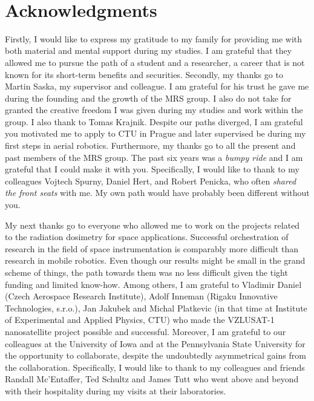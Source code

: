 
~\vfill{}

\section*{Acknowledgments}

Firstly, I would like to express my gratitude to my family for providing me with both material and mental support during my studies.
I am grateful that they allowed me to pursue the path of a student and a researcher, a career that is not known for its short-term benefits and securities.
Secondly, my thanks go to Martin Saska, my supervisor and colleague.
I am grateful for his trust he gave me during the founding and the growth of the MRS group.
I also do not take for granted the creative freedom I was given during my studies and work within the group.
I also thank to Tomas Krajnik.
Despite our paths diverged, I am grateful you motivated me to apply to CTU in Prague and later supervised be during my first steps in aerial robotics.
Furthermore, my thanks go to all the present and past members of the MRS group.
The past six years was a \emph{bumpy ride} and I am grateful that I could make it with you.
Specifically, I would like to thank to my colleagues Vojtech Spurny, Daniel Hert, and Robert Penicka, who often \emph{shared the front seats} with me.
My own path would have probably been different without you.

My next thanks go to everyone who allowed me to work on the projects related to the radiation dosimetry for space applications.
Successful orchestration of research in the field of space instrumentation is comparably more difficult than research in mobile robotics.
Even though our results might be small in the grand scheme of things, the path towards them was no less difficult given the tight funding and limited know-how.
Among others, I am grateful to Vladimir Daniel (Czech Aerospace Research Institute), Adolf Inneman (Rigaku Innovative Technologies, s.r.o.), Jan Jakubek and Michal Platkevic (in that time at Institute of Experimental and Applied Physics, CTU) who made the VZLUSAT-1 nanosatellite project possible and successful.
Moreover, I am grateful to our colleagues at the University of Iowa and at the Pennsylvania State University for the opportunity to collaborate, despite the undoubtedly asymmetrical gains from the collaboration.
Specifically, I would like to thank to my colleagues and friends Randall Mc'Entaffer, Ted Schultz and James Tutt who went above and beyond with their hospitality during my visits at their laboratories.

